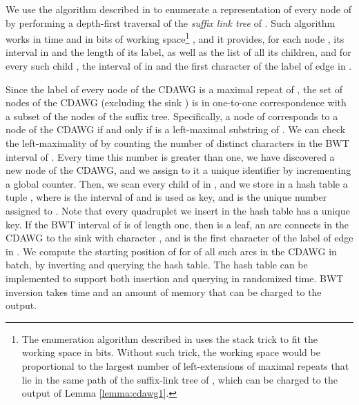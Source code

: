 \documentclass[a4paper,UKenglish]{lipics-v2016}
\begin{document}
We use the algorithm described in \cite{belazzougui2014linear} to enumerate a representation of every node of  by performing a depth-first traversal of the \emph{suffix link tree} of . Such algorithm works in  time and in  bits of working space\footnote{The enumeration algorithm described in \cite{belazzougui2014linear} uses the stack trick to fit the working space in  bits. Without such trick, the working space would be proportional to the largest number of left-extensions of maximal repeats that lie in the same path of the suffix-link tree of , which can be charged to the output of Lemma \ref{lemma:cdawg1}.}
, and it provides, for each node , its interval in  and the length of its label, as well as the list of all its children, and for every such child , the interval of  in  and the first character of the label of edge  in . 

Since the label of every node of the CDAWG is a maximal repeat of , the set of nodes of the CDAWG (excluding the sink ) is in one-to-one correspondence with a subset of the nodes of the suffix tree. Specifically, a node  of  corresponds to a node  of the CDAWG if and only if  is a left-maximal substring of . We can check the left-maximality of  by counting the number of distinct characters in the BWT interval of . Every time this number is greater than one, we have discovered a new node  of the CDAWG, and we assign to it a unique identifier by incrementing a global counter. Then, we scan every child  of  in , and we store in a hash table a tuple , where  is the interval of  and is used as key, and  is the unique number assigned to . Note that every quadruplet we insert in the hash table has a unique key. If the BWT interval of  is of length one, then  is a leaf, an arc connects  in the CDAWG to the sink  with character , and  is the first character of the label of edge  in . We compute the starting position of  for of all such arcs  in the CDAWG in batch, by inverting  and querying the hash table. The hash table can be implemented to support both insertion and querying in  randomized time. BWT inversion takes  time and an amount of memory that can be charged to the output.
\end{document}

